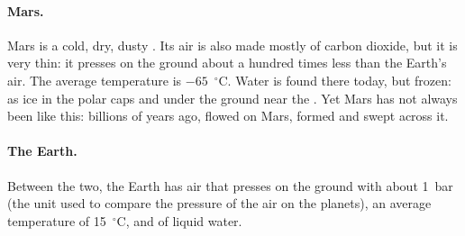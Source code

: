 \paragraph{Mars.} Mars is a cold, dry, dusty . Its air is also made
mostly of carbon dioxide, but it is very thin: it presses on the ground
about a hundred times less than the Earth's air. The average temperature is
$-65$~$^\circ$C. Water is found there today, but frozen: as ice in the
polar caps and under the ground near the . Yet Mars has not always
been like this: billions of years ago,  flowed on Mars,  formed
and  swept across it.

\paragraph{The Earth.} Between the two, the Earth has air that presses on
the ground with about 1~bar (the unit used to compare the pressure of the
air on the planets), an average temperature of 15~$^\circ$C, and  of
liquid water.

